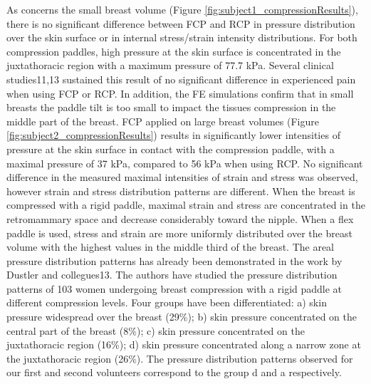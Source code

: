 As concerns the small breast volume (Figure \ref{fig:subject1_compressionResults}), there is no significant difference between FCP and RCP in pressure distribution over the skin surface or in internal stress/strain intensity distributions. For both compression paddles, high pressure at the skin surface is concentrated in the juxtathoracic region with a maximum pressure of 77.7 kPa. Several clinical studies11,13 sustained this result of no significant difference in experienced pain when using FCP or RCP. In addition, the FE simulations confirm that in small breasts the paddle tilt is too small to impact the tissues compression in the middle part of the breast. 
FCP applied on large breast volumes (Figure \ref{fig:subject2_compressionResults}) results in significantly lower intensities of pressure at the skin surface in contact with the compression paddle, with a maximal pressure of 37 kPa, compared to 56 kPa when using RCP. No significant difference in the measured maximal intensities of strain and stress was observed, however strain and stress distribution patterns are different. When the breast is compressed with a rigid paddle, maximal strain and stress are concentrated in the retromammary space and decrease considerably toward the nipple. When a flex paddle is used, stress and strain are more uniformly distributed over the breast volume with the highest values in the middle third of the breast.
The areal pressure distribution patterns has already been demonstrated in the work by Dustler and collegues13. The authors have studied the pressure distribution patterns of 103 women undergoing breast compression with a rigid paddle at different compression levels. Four groups have been differentiated: a) skin pressure widespread over the breast (29\%); b) skin pressure concentrated on the central part of the breast (8\%); c) skin pressure concentrated on the juxtathoracic region (16\%); d) skin pressure concentrated along a narrow zone at the juxtathoracic region (26\%).  The pressure distribution patterns observed for our first and second volunteers correspond to the group d and a respectively.


